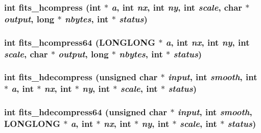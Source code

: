 \subsubsection{\setlength{\rightskip}{0pt plus 5cm}int fits\_\-hcompress (int $\ast$ {\em a}, int {\em nx}, int {\em ny}, int {\em scale}, char $\ast$ {\em output}, long $\ast$ {\em nbytes}, int $\ast$ {\em status})}\label{fitsio_8h_9d65ebdca580c566c8c94d1e1356abb4}


\subsubsection{\setlength{\rightskip}{0pt plus 5cm}int fits\_\-hcompress64 (\bf{LONGLONG} $\ast$ {\em a}, int {\em nx}, int {\em ny}, int {\em scale}, char $\ast$ {\em output}, long $\ast$ {\em nbytes}, int $\ast$ {\em status})}\label{fitsio_8h_6a8c7a3b62ae7c4528dc04366c28309b}


\subsubsection{\setlength{\rightskip}{0pt plus 5cm}int fits\_\-hdecompress (unsigned char $\ast$ {\em input}, int {\em smooth}, int $\ast$ {\em a}, int $\ast$ {\em nx}, int $\ast$ {\em ny}, int $\ast$ {\em scale}, int $\ast$ {\em status})}\label{fitsio_8h_1f0bd67aa23a45cf824d7a4681ce71d4}


\subsubsection{\setlength{\rightskip}{0pt plus 5cm}int fits\_\-hdecompress64 (unsigned char $\ast$ {\em input}, int {\em smooth}, \bf{LONGLONG} $\ast$ {\em a}, int $\ast$ {\em nx}, int $\ast$ {\em ny}, int $\ast$ {\em scale}, int $\ast$ {\em status})}\label{fitsio_8h_06da1ed6323737d8fc2a3bc74cc0022a}



